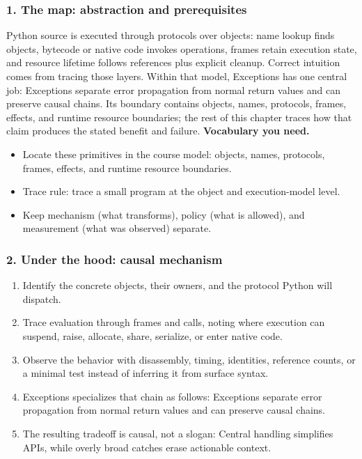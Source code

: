 \subsubsection*{1. The map: abstraction and prerequisites}
Python source is executed through protocols over objects: name lookup finds objects, bytecode or native code invokes operations, frames retain execution state, and resource lifetime follows references plus explicit cleanup. Correct intuition comes from tracing those layers.
Within that model, Exceptions has one central job: Exceptions separate error propagation from normal return values and can preserve causal chains. Its boundary contains objects, names, protocols, frames, effects, and runtime resource boundaries; the rest of this chapter traces how that claim produces the stated benefit and failure.
\textbf{Vocabulary you need.}\begin{itemize}
\item Locate these primitives in the course model: objects, names, protocols, frames, effects, and runtime resource boundaries.
\item Trace rule: trace a small program at the object and execution-model level.
\item Keep mechanism (what transforms), policy (what is allowed), and measurement (what was observed) separate.
\end{itemize}
\subsubsection*{2. Under the hood: causal mechanism}\begin{enumerate}
\item Identify the concrete objects, their owners, and the protocol Python will dispatch.
\item Trace evaluation through frames and calls, noting where execution can suspend, raise, allocate, share, serialize, or enter native code.
\item Observe the behavior with disassembly, timing, identities, reference counts, or a minimal test instead of inferring it from surface syntax.
\item Exceptions specializes that chain as follows: Exceptions separate error propagation from normal return values and can preserve causal chains.
\item The resulting tradeoff is causal, not a slogan: Central handling simplifies APIs, while overly broad catches erase actionable context.
\end{enumerate}

